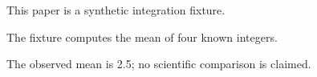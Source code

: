 \documentclass{article}
\begin{document}
This paper is a synthetic integration fixture.

The fixture computes the mean of four known integers.

The observed mean is 2.5; no scientific comparison is claimed.
\end{document}
